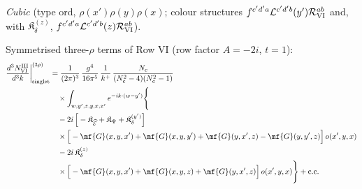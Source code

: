 {\emph{Cubic} (type ord, $\rho(x')\rho(y)\rho(x)$; colour structures $f^{c'd'a}\mathcal{L}^{c'd'b}(y')\mathcal{R}^{ab}_{\rm VI}$ and, with $\mathfrak{K}_{\delta}^{(z)}$, $f^{c'd'a}\mathcal{L}^{c'd'b}(z)\mathcal{R}^{ab}_{\rm VI}$).

 Symmetrised three-$\rho$ terms of Row VI (row factor $A=-2i$, $t=1$):
\begin{align}
\frac{d^{3}N^{\rm III}_{\rm VI}}{d^{3}k}\bigg|^{(3\rho)}_{\rm singlet}&=\frac{1}{(2\pi)^{3}}\,\frac{g^{4}}{16\pi^{5}}\,\frac{1}{k^{+}}\,\frac{N_{c}}{(N_{c}^{2}-4)(N_{c}^{2}-1)}\notag\\
&\quad\times\int_{w,y',z,y,x,x'}e^{-ik\cdot(w-y')}\Bigg\{\notag\\
&\quad-2i\,\Big[-\mathfrak{K}_{\widehat{\mathcal{E}}}+\mathfrak{K}_{\Psi}+\mathfrak{K}_{\delta}^{(y')}\Big]\notag\\
&\quad\times\Big[-\mf{G}(x,y,x')+\mf{G}(x,y,y')+\mf{G}(y,x',z)-\mf{G}(y,y',z)\Big]\,o(x',y,x)\notag\\
&\quad-2i\,\mathfrak{K}_{\delta}^{(z)}\notag\\
&\quad\times\Big[-\mf{G}(x,y,x')+\mf{G}(x,y,z)+\mf{G}(y,x',z)\Big]\,o(x',y,x)\Bigg\}+{\rm c.c.}\label{eq:s-o-III-VI}
\end{align}

}
